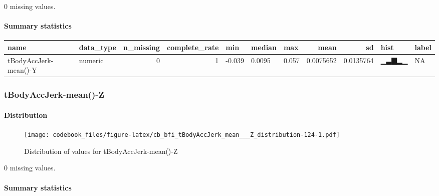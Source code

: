 \documentclass[
]{article}
\begin{document}
0 missing values.

\hypertarget{tBodyAccJerk_mean___Y_summary}{%
\paragraph{Summary statistics}\label{tBodyAccJerk_mean___Y_summary}}

\begin{longtable}[]{@{}llrrlllrrll@{}}
\toprule
name & data\_type & n\_missing & complete\_rate & min & median & max &
mean & sd & hist & label \\
\midrule
\endhead
tBodyAccJerk-mean()-Y & numeric & 0 & 1 & -0.039 & 0.0095 & 0.057 &
0.0075652 & 0.0135764 & ▁▃▇▂▁ & NA \\
\bottomrule
\end{longtable}

\hypertarget{tBodyAccJerk_mean___Z}{%
\subsubsection{tBodyAccJerk-mean()-Z}\label{tBodyAccJerk_mean___Z}}

\hypertarget{tBodyAccJerk_mean___Z_distribution}{%
\paragraph{Distribution}\label{tBodyAccJerk_mean___Z_distribution}}

\begin{figure}
\centering
\texttt{[image: codebook\_files/figure-latex/cb\_bfi\_tBodyAccJerk\_mean\_\_\_Z\_distribution-124-1.pdf]}
\caption{Distribution of values for tBodyAccJerk-mean()-Z}
\end{figure}

0 missing values.

\hypertarget{tBodyAccJerk_mean___Z_summary}{%
\paragraph{Summary statistics}\label{tBodyAccJerk_mean___Z_summary}}
\end{document}
